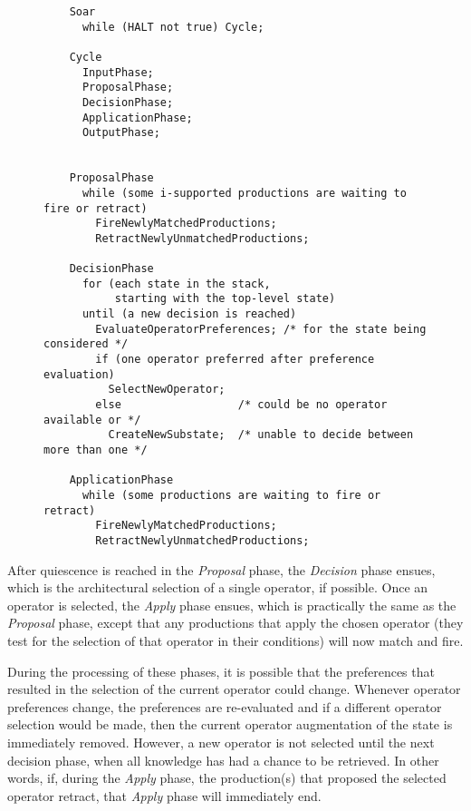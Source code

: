 \begin{figure}
	\label{fig:decisioncycle}
\end{figure}

\begin{figure}
	\begin{verbatim}
	Soar
	  while (HALT not true) Cycle;

	Cycle
	  InputPhase;
	  ProposalPhase;
	  DecisionPhase;
	  ApplicationPhase;
	  OutputPhase;


	ProposalPhase
	  while (some i-supported productions are waiting to fire or retract)
	    FireNewlyMatchedProductions;
	    RetractNewlyUnmatchedProductions;

	DecisionPhase
	  for (each state in the stack,
	       starting with the top-level state)
	  until (a new decision is reached)
	    EvaluateOperatorPreferences; /* for the state being considered */
	    if (one operator preferred after preference evaluation)
	      SelectNewOperator;
	    else                  /* could be no operator available or */
	      CreateNewSubstate;  /* unable to decide between more than one */

	ApplicationPhase
	  while (some productions are waiting to fire or retract)
	    FireNewlyMatchedProductions;
	    RetractNewlyUnmatchedProductions;
	\end{verbatim}

	\label{fig:pseudocode}
\end{figure}

After quiescence is reached in the \emph{Proposal} phase, the \emph{Decision} phase ensues, which is the architectural selection of a single operator, if possible. Once an operator is selected, the \emph{Apply} phase ensues, which is practically the same as the \emph{Proposal} phase, except that any productions that apply the chosen operator (they test for the selection of that operator in their conditions) will now match and fire.

During the processing of these phases, it is possible that the preferences that resulted in the selection of the current operator could change.  Whenever operator preferences change, the preferences are re-evaluated and if a different operator selection would be made, then the current operator augmentation of the state is immediately removed. However, a new operator is not selected until the next decision phase, when all knowledge has had a chance to be retrieved. In other words, if, during the \emph{Apply} phase, the production(s) that proposed the selected operator retract, that \emph{Apply} phase will immediately end.


